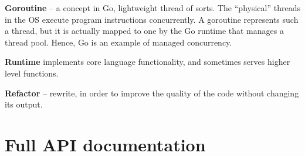 \documentclass{l3proj}
\begin{document}
\begin{appendices}
\textbf{Goroutine} -- a concept in Go, lightweight thread of sorts. The ``physical'' threads in the OS execute program instructions concurrently. A goroutine represents such a thread, but it is actually mapped to one by the Go runtime that manages a thread pool. Hence, Go is an example of managed concurrency.

\textbf{Runtime} implements core language functionality, and sometimes serves higher level functions.

\textbf{Refactor} -- rewrite, in order to improve the quality of the code without changing its output.



\chapter{Full API documentation}

\end{appendices}




\end{document}
